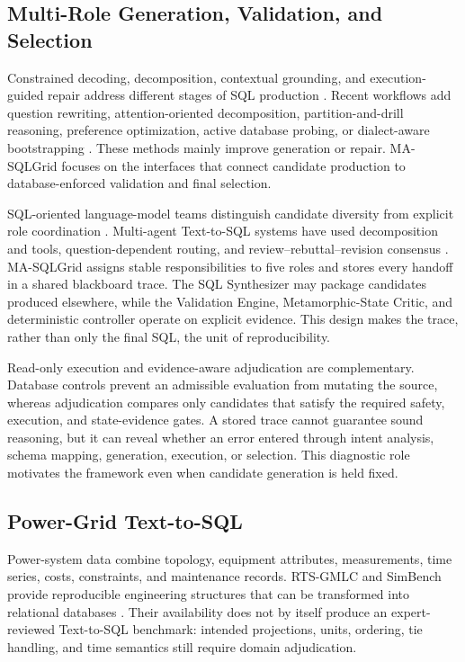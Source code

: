 \documentclass[applsci,article,submit,moreauthors]{Definitions/mdpi}
\newcommand{\masql}{MA-SQLGrid}
\begin{document}
\subsection{Multi-Role Generation, Validation, and Selection}

Constrained decoding, decomposition, contextual grounding, and execution-guided repair address different stages of SQL production \cite{scholak2021picard,nan2023enhancing,sun2023sqlprompt,pourreza2023dinsql,talaei2024chess}. Recent workflows add question rewriting, attention-oriented decomposition, partition-and-drill reasoning, preference optimization, active database probing, or dialect-aware bootstrapping \cite{mao2024dartsql,xie2024deasql,luo2024ptdsql,zhai2025executionfeedback,xie2026sdesql,zhang2025exesql}. These methods mainly improve generation or repair. \masql{} focuses on the interfaces that connect candidate production to database-enforced validation and final selection.

SQL-oriented language-model teams distinguish candidate diversity from explicit role coordination \cite{lee2025team}. Multi-agent Text-to-SQL systems have used decomposition and tools, question-dependent routing, and review--rebuttal--revision consensus \cite{wang2025macsql,shao2025qcmasql,xia2025r3}. \masql{} assigns stable responsibilities to five roles and stores every handoff in a shared blackboard trace. The SQL Synthesizer may package candidates produced elsewhere, while the Validation Engine, Metamorphic-State Critic, and deterministic controller operate on explicit evidence. This design makes the trace, rather than only the final SQL, the unit of reproducibility.

Read-only execution and evidence-aware adjudication are complementary. Database controls prevent an admissible evaluation from mutating the source, whereas adjudication compares only candidates that satisfy the required safety, execution, and state-evidence gates. A stored trace cannot guarantee sound reasoning, but it can reveal whether an error entered through intent analysis, schema mapping, generation, execution, or selection. This diagnostic role motivates the framework even when candidate generation is held fixed.

\subsection{Power-Grid Text-to-SQL}

Power-system data combine topology, equipment attributes, measurements, time series, costs, constraints, and maintenance records. RTS-GMLC and SimBench provide reproducible engineering structures that can be transformed into relational databases \cite{barrows2020rts,meinecke2020simbench}. Their availability does not by itself produce an expert-reviewed Text-to-SQL benchmark: intended projections, units, ordering, tie handling, and time semantics still require domain adjudication.
\end{document}
